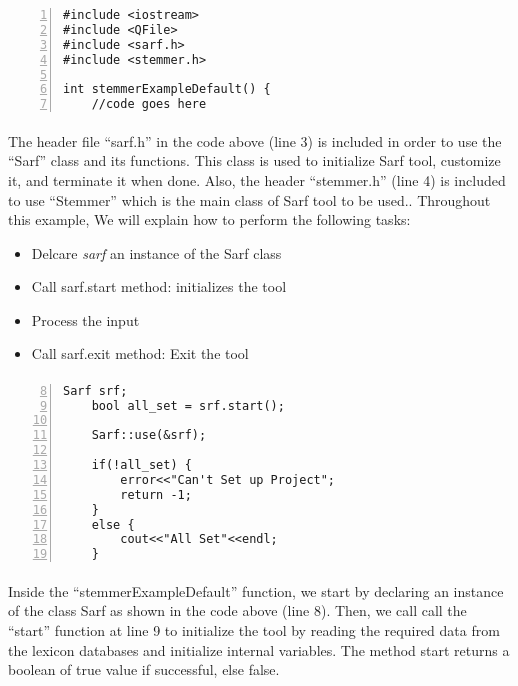 \documentclass{article}
\begin{document}
\begin{Verbatim}[numbers=left]
#include <iostream>
#include <QFile>
#include <sarf.h>
#include <stemmer.h>

int stemmerExampleDefault() {
	//code goes here
\end{Verbatim}

\paragraph{}
The header file ``sarf.h'' in the code above (line 3) is included in order to use the ``Sarf'' class and its functions. This class is used to initialize Sarf tool, customize it, and terminate it when done. Also, the header ``stemmer.h'' (line 4) is included to use ``Stemmer'' which is the main class of Sarf tool to be used.. Throughout this example, We will explain how to perform the following tasks:

\begin{itemize}
\item Delcare {\em sarf}  an instance of the Sarf class
\item Call {sarf.start } method: initializes the tool
\item Process the input
\item Call {sarf.exit } method: Exit the tool
\end{itemize}

\paragraph{}
\begin{Verbatim}[numbers=left,firstnumber=8]
    Sarf srf;
    bool all_set = srf.start();

    Sarf::use(&srf);

    if(!all_set) {
        error<<"Can't Set up Project";
        return -1;
    }
    else {
        cout<<"All Set"<<endl;
    }
\end{Verbatim}

\paragraph{}
Inside the ``stemmerExampleDefault'' function, we start by declaring an instance of the class Sarf as shown in the code above (line 8). Then, we call call the ``start'' function at line 9 to initialize the tool by reading the required data from the lexicon databases and initialize internal variables. The method start returns a boolean of true value if successful, else false.\\
\end{document}
